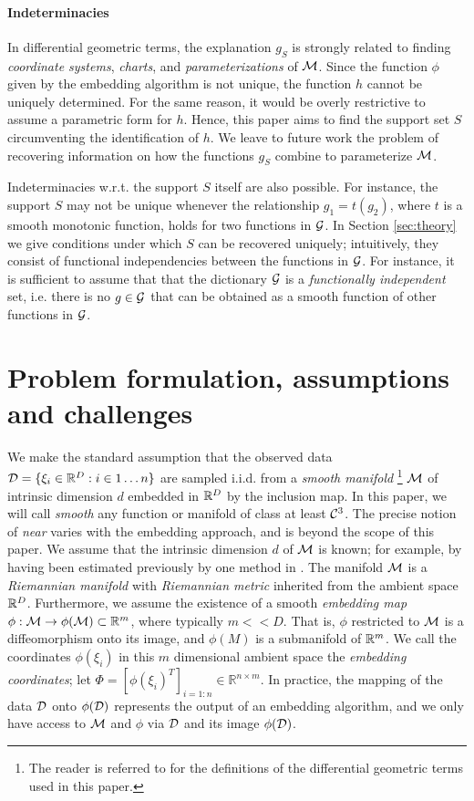 \paragraph{Indeterminacies}
In differential geometric terms, the explanation $g_S$ is strongly related to finding {\em coordinate systems}, {\em charts}, and {\em parameterizations} of ${\cal M}$.
Since the function $\phi$ given by the embedding algorithm is not unique, the function $h$ cannot be uniquely determined. For the same reason, it would be overly restrictive to assume a parametric form for $h$. Hence, this paper aims to find the support set $S$ circumventing the identification of $h$. We leave to future work the problem of recovering information on how the functions $g_S$ combine to parameterize ${\cal M}$.

Indeterminacies w.r.t. the support $S$ itself are also possible. For instance, the support $S$ may not be unique whenever the relationship  $g_1=t(g_2)$, where $t$ is a smooth monotonic function, holds for two functions in ${\cal G}$.
 In Section \ref{sec:theory}
we give conditions under which $S$ can be
recovered uniquely; intuitively, they consist of functional
independencies between the functions in ${\cal G}$. For instance, it is
sufficient to assume that that the dictionary ${\cal G}$ is a {\em
  functionally independent} set, i.e. there is no $g\in {\cal G}$ that can be
obtained as a smooth function of other functions in ${\cal G}$. 

\section{Problem formulation, assumptions and challenges}
We make the standard assumption that the observed data
${\cal D}=\{\xi_i \in {\mathbb R}^D : i \in 1 \dotsc n\}$ are sampled
i.i.d. from a {\em smooth manifold} \footnote{The reader is referred
  to \citet{smoothmfd} for the definitions of the differential
  geometric terms used in this paper.} ${\cal M}$ of intrinsic dimension $d$
embedded in ${\mathbb R}^D$ by the inclusion map. In this
paper, we will call {\em smooth} any function or manifold of class at
least ${\cal C}^3$. The precise notion of {\em near} varies with
  the embedding approach, and is beyond the scope of this paper. We
assume that the intrinsic dimension $d$ of ${\cal M}$ is known; for example,
by having been estimated previously by one method in
\citet{Kleindessner2015DimensionalityEW}. The manifold ${\cal M}$ is a {\em
  Riemannian manifold} with {\em Riemannian metric} inherited from the
ambient space ${\mathbb R}^D$. Furthermore, we assume the existence of a
smooth {\em embedding map} $\phi:{\cal M}\rightarrow \phi({\cal M})\subset{\mathbb R}^m$,
where typically $m << D$.  That is, $\phi$ restricted to ${\cal M}$ is
  a diffeomorphism onto its image, and $\phi(M)$ is a submanifold of
  ${\mathbb R}^m$.  We call the coordinates $\phi(\xi_i)$ in this $m$
dimensional ambient space the {\em embedding coordinates}; let $\Phi =
[\phi(\xi_i)^T]_{i=1:n} \in \mathbb R^{n\times m}$.  In practice, the
mapping of the data ${\cal D}$ onto $\phi({\cal D})$ represents the
output of an embedding algorithm, and we only have access to ${\cal M}$ and
$\phi$ via ${\cal D}$ and its image $\phi({\cal D})$.

